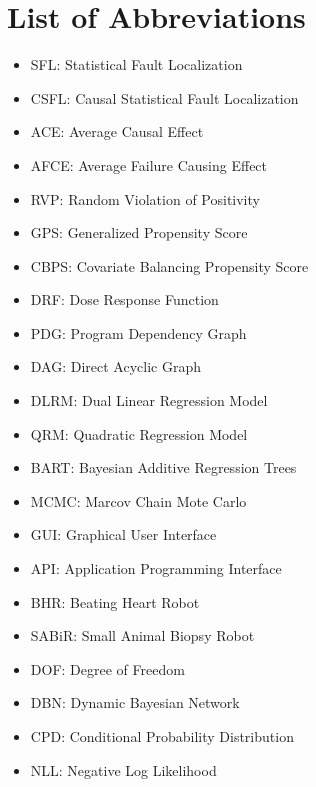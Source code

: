 \newpage
\section*{List of Abbreviations}
\begin{itemize}
  \item SFL: Statistical Fault Localization
  \item CSFL: Causal Statistical Fault Localization
  \item ACE: Average Causal Effect
  \item AFCE: Average Failure Causing Effect
  \item RVP: Random Violation of Positivity
  \item GPS: Generalized Propensity Score
  \item CBPS: Covariate Balancing Propensity Score
  \item DRF: Dose Response Function
  \item PDG: Program Dependency Graph
  \item DAG: Direct Acyclic Graph
  \item DLRM: Dual Linear Regression Model
  \item QRM: Quadratic Regression Model
  \item BART: Bayesian Additive Regression Trees
  \item MCMC: Marcov Chain Mote Carlo
  \item GUI: Graphical User Interface
  \item API: Application Programming Interface
  \item BHR: Beating Heart Robot
  \item SABiR: Small Animal Biopsy Robot
  \item DOF: Degree of Freedom
  \item DBN: Dynamic Bayesian Network
  \item CPD: Conditional Probability Distribution
  \item NLL: Negative Log Likelihood
\end{itemize}